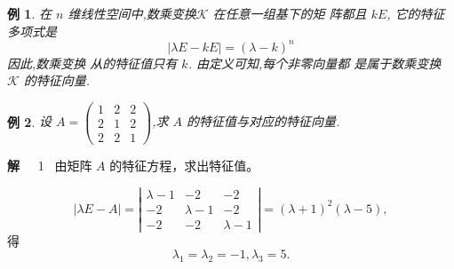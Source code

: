 \documentclass[13pt]{beamer}
\newtheorem{exa}{例}
\def\sol{{\bf 解~~ }}
\def\A{\mathscr{A}}
\begin{document}
\begin{frame}
\begin{exa}
在 $n$ 维线性空间中,数乘变换$\mathscr{K}$ 在任意一组基下的矩 阵都且 $kE$, 它的特征多项式是
\[
|\lambda {E}-k {E}|=(\lambda-k)^{n}
\]
因此,数乘变换 从的特征值只有 $k$. 由定义可知,每个非零向量都 是属于数乘变换 $\mathscr{K}$ 的特征向量.
\end{exa}
\end{frame}



\begin{frame}

\begin{exa}
设 $A=\left(\begin{array}{ccc}1 & 2 & 2 \\ 2 & 1 & 2 \\ 2 & 2 & 1\end{array}\right)$,求 $A$ 的特征值与对应的特征向量.
\end{exa}

\sol
1~ 由矩阵 $A$ 的特征方程，求出特征值。

$$|\lambda E-A|=\left|\begin{array}{ccc}\lambda-1 & -2 & -2 \\ -2 & \lambda-1 & -2 \\ -2 & -2 & \lambda-1\end{array}\right|=(\lambda+1)^{2}(\lambda-5),$$
得
$$\lambda_{1}=\lambda_{2}=-1, \lambda_{3}=5.$$

\end{frame}
\end{document}
